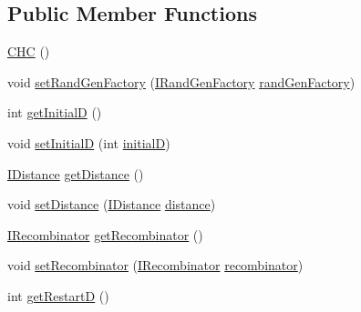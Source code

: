 \subsection*{Public Member Functions}
\begin{DoxyCompactItemize}
\item 
\hyperlink{classnet_1_1sf_1_1jclec_1_1algorithm_1_1classic_1_1_c_h_c_a4729dc96519b67a9ae66ddedd03847b4}{C\-H\-C} ()
\item 
void \hyperlink{classnet_1_1sf_1_1jclec_1_1algorithm_1_1classic_1_1_c_h_c_ad67660256f71edbc94359158049140b5}{set\-Rand\-Gen\-Factory} (\hyperlink{interfacenet_1_1sf_1_1jclec_1_1util_1_1random_1_1_i_rand_gen_factory}{I\-Rand\-Gen\-Factory} \hyperlink{classnet_1_1sf_1_1jclec_1_1algorithm_1_1_population_algorithm_a8cb8eb8086086a7ddd879f8e0c1468d7}{rand\-Gen\-Factory})
\item 
int \hyperlink{classnet_1_1sf_1_1jclec_1_1algorithm_1_1classic_1_1_c_h_c_affa00f6d4ac6082f31a2f9add3cf138d}{get\-Initial\-D} ()
\item 
void \hyperlink{classnet_1_1sf_1_1jclec_1_1algorithm_1_1classic_1_1_c_h_c_ac898e18ad4b2a2dcd655a275ef0a7f6c}{set\-Initial\-D} (int \hyperlink{classnet_1_1sf_1_1jclec_1_1algorithm_1_1classic_1_1_c_h_c_a4b7c785a6c035901c27655736802f1d5}{initial\-D})
\item 
\hyperlink{interfacenet_1_1sf_1_1jclec_1_1_i_distance}{I\-Distance} \hyperlink{classnet_1_1sf_1_1jclec_1_1algorithm_1_1classic_1_1_c_h_c_aaaea1616cfd0bfd5bd049936c189e266}{get\-Distance} ()
\item 
void \hyperlink{classnet_1_1sf_1_1jclec_1_1algorithm_1_1classic_1_1_c_h_c_aaab3b5ede7b5650bbb5b1f51532656b7}{set\-Distance} (\hyperlink{interfacenet_1_1sf_1_1jclec_1_1_i_distance}{I\-Distance} \hyperlink{classnet_1_1sf_1_1jclec_1_1algorithm_1_1classic_1_1_c_h_c_af5aede7c9435b3e8d6826e880c7247dc}{distance})
\item 
\hyperlink{interfacenet_1_1sf_1_1jclec_1_1_i_recombinator}{I\-Recombinator} \hyperlink{classnet_1_1sf_1_1jclec_1_1algorithm_1_1classic_1_1_c_h_c_a039c94fe5c17aba606cb794dacd9ae7c}{get\-Recombinator} ()
\item 
void \hyperlink{classnet_1_1sf_1_1jclec_1_1algorithm_1_1classic_1_1_c_h_c_a775859e89f9dab908522cb00aabf5e7f}{set\-Recombinator} (\hyperlink{interfacenet_1_1sf_1_1jclec_1_1_i_recombinator}{I\-Recombinator} \hyperlink{classnet_1_1sf_1_1jclec_1_1algorithm_1_1classic_1_1_c_h_c_ab57efc757b80ad7047b60477e7329718}{recombinator})
\item 
int \hyperlink{classnet_1_1sf_1_1jclec_1_1algorithm_1_1classic_1_1_c_h_c_a0e46f9df67ccf3ab215c5be86cb30bc1}{get\-Restart\-D} ()

\end{DoxyCompactItemize}
